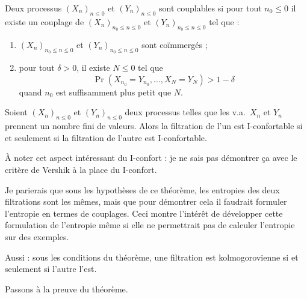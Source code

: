 \documentclass[12pt,a4paper]{article}
\begin{document}
\begin{definition}
Deux processus  ${(X_n)}_{n \leq 0}$ et ${(Y_n)}_{n \leq 0}$ sont couplables 
si pour tout $n_0 \leq 0$ il existe un couplage de 
${(X_n)}_{n_0 \leq n \leq 0}$ et ${(Y_n)}_{n_0 \leq n \leq 0}$ tel que :
\begin{enumerate}
\item ${(X_n)}_{n_0 \leq n \leq 0}$ et ${(Y_n)}_{n_0 \leq n \leq 0}$ 
sont co\"immergés ; 

\item  pour tout $\delta >0$, il existe $N \leq 0$ tel que   
$$
\Pr(X_{n_0}=Y_{n_0}, \ldots, X_N=Y_N) > 1-\delta 
$$
quand $n_0$ est suffisamment plus petit que $N$.
\end{enumerate} 
\end{definition}


\begin{thm}\label{thm:joining}
Soient ${(X_n)}_{n \leq 0}$ et ${(Y_n)}_{n \leq 0}$ deux processus 
telles que les v.a.\ $X_n$ et $Y_n$ prennent un nombre fini de valeurs. 
Alors la filtration de l'un est I-confortable si et seulement si 
la filtration de l'autre est I-confortable.
\end{thm} 

À noter cet aspect intéressant du I-confort : 
je ne sais pas démontrer ça avec le critère de Vershik à la place du I-confort. 

Je parierais que sous les hypothèses de ce théorème, les entropies des deux 
filtrations sont les mêmes, mais que pour démontrer cela il faudrait formuler l'entropie en 
termes de couplages. Ceci montre l'intérêt de développer cette formulation 
de l'entropie même si elle ne permettrait pas de calculer l'entropie sur des exemples.

Aussi : sous les conditions du théorème, une filtration est kolmogorovienne si et seulement 
si l'autre l'est. 

Passons à la preuve du théorème.

\end{document}
